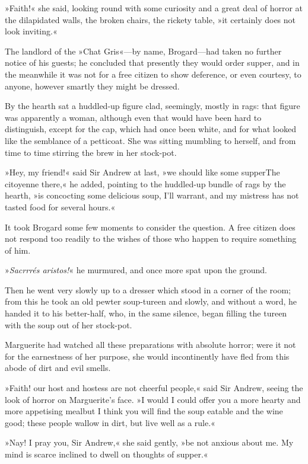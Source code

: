 »Faith!« she said, looking round with some curiosity and a great deal of horror at the dilapidated walls, the broken chairs, the rickety table, »it certainly does not look inviting.«

The landlord of the »Chat Gris«—by name, Brogard—had taken no further notice of his guests; he concluded that presently they would order supper, and in the meanwhile it was not for a free citizen to show deference, or even courtesy, to anyone, however smartly they might be dressed.

By the hearth sat a huddled-up figure clad, seemingly, mostly in rags: that figure was apparently a woman, although even that would have been hard to distinguish, except for the cap, which had once been white, and for what looked like the semblance of a petticoat. She was sitting mumbling to herself, and from time to time stirring the brew in her stock-pot.

»Hey, my friend!« said Sir Andrew at last, »we should like some supper\textellipsis \allowbreak  The citoyenne there,« he added, pointing to the huddled-up bundle of rags by the hearth, »is concocting some delicious soup, I'll warrant, and my mistress has not tasted food for several hours.«

It took Brogard some few moments to consider the question. A free citizen does not respond too readily to the wishes of those who happen to require something of him.

»\textit{Sacrrrés aristos!}« he murmured, and once more spat upon the ground.

Then he went very slowly up to a dresser which stood in a corner of the room; from this he took an old pewter soup-tureen and slowly, and without a word, he handed it to his better-half, who, in the same silence, began filling the tureen with the soup out of her stock-pot.

Marguerite had watched all these preparations with absolute horror; were it not for the earnestness of her purpose, she would incontinently have fled from this abode of dirt and evil smells.

»Faith! our host and hostess are not cheerful people,« said Sir Andrew, seeing the look of horror on Marguerite's face. »I would I could offer you a more hearty and more appetising meal\textellipsis \allowbreak  but I think you will find the soup eatable and the wine good; these people wallow in dirt, but live well as a rule.«

»Nay! I pray you, Sir Andrew,« she said gently, »be not anxious about me. My mind is scarce inclined to dwell on thoughts of supper.«


